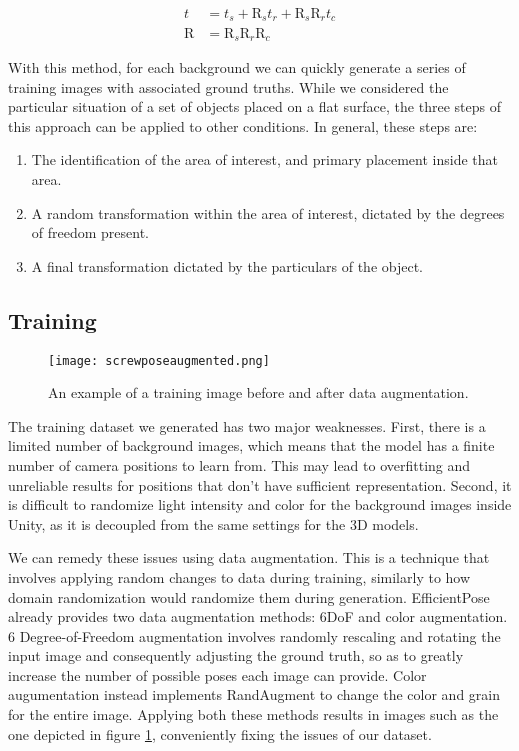 \begin{align*}
    t &= t_s + \text{R}_s t_r + \text{R}_s \text{R}_r t_c\\
    \text{R} &= \text{R}_s \text{R}_r \text{R}_c
\end{align*}

With this method, for each background we can quickly generate a series of training images with associated ground truths. While we considered the particular situation of a set of objects placed on a flat surface, the three steps of this approach can be applied to other conditions. In general, these steps are:

\begin{enumerate}
    \item The identification of the area of interest, and primary placement inside that area.
    \item A random transformation within the area of interest, dictated by the degrees of freedom present.
    \item A final transformation dictated by the particulars of the object.
\end{enumerate}

\subsection{Training}

\begin{figure}[ht]
    \texttt{[image: screwposeaugmented.png]}
    \caption{An example of a training image before and after data augmentation.}
    \label{fig:ScrewPoseAugmented}
\end{figure}

The training dataset we generated has two major weaknesses. First, there is a limited number of background images, which means that the model has a finite number of camera positions to learn from. This may lead to overfitting and unreliable results for positions that don't have sufficient representation. Second, it is difficult to randomize light intensity and color for the background images inside Unity, as it is decoupled from the same settings for the 3D models.

We can remedy these issues using data augmentation. This is a technique that involves applying random changes to data during training, similarly to how domain randomization would randomize them during generation. EfficientPose already provides two data augmentation methods: 6DoF and color augmentation. 6 Degree-of-Freedom augmentation involves randomly rescaling and rotating the input image and consequently adjusting the ground truth, so as to greatly increase the number of possible poses each image can provide. Color augumentation instead implements RandAugment\cite{RandAugment} to change the color and grain for the entire image. Applying both these methods results in images such as the one depicted in figure \ref{fig:ScrewPoseAugmented}, conveniently fixing the issues of our dataset.

